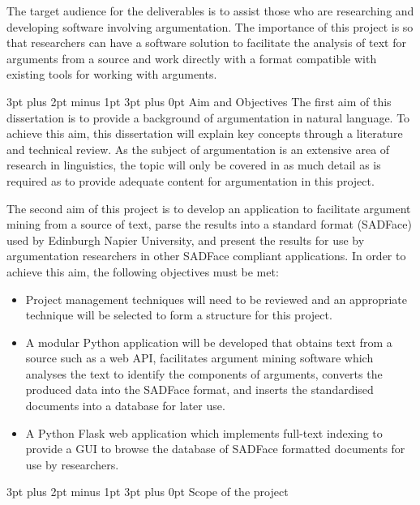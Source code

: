 \documentclass[12pt,a4paper]{article}
\makeatletter
\renewcommand\subsection{\@startsection {subsection}{1}{2mm} %
                               {3pt plus 2pt minus 1pt} %
                               {3pt plus 0pt} %
                               {\normalfont\bfseries}}
\makeatother
\begin{document}
The target audience for the deliverables is to assist those who are researching and developing software involving argumentation. The importance of this project is so that researchers can have a software solution to facilitate the analysis of text for arguments from a source and work directly with a format compatible with existing tools for working with arguments.\newline

\subsection{Aim and Objectives}
The first aim of this dissertation is to provide a background of argumentation in natural language. To achieve this aim, this dissertation will explain key concepts through a literature and technical review. As the subject of argumentation is an extensive area of research in linguistics, the topic will only be covered in as much detail as is required as to provide adequate content for argumentation in this project.

The second aim of this project is to develop an application to facilitate argument mining from a source of text, parse the results into a standard format (SADFace) used by Edinburgh Napier University, and present the results for use by argumentation researchers in other SADFace compliant applications. In order to achieve this aim, the following objectives must be met:
\begin{itemize}
    \item Project management techniques will need to be reviewed and an appropriate technique will be selected to form a structure for this project.
    \item A modular Python application will be developed that obtains text from a source such as a web API, facilitates argument mining software which analyses the text to identify the components of arguments, converts the produced data into the SADFace format, and inserts the standardised documents into a database for later use.
    \item A Python Flask web application which implements full-text indexing to provide a GUI to browse the database of SADFace formatted documents for use by researchers.
\end{itemize}

\subsection{Scope of the project}
\end{document}
